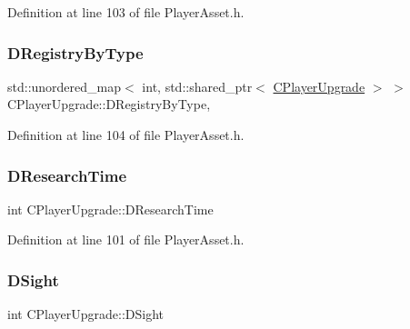 Definition at line 103 of file Player\+Asset.\+h.

\hypertarget{classCPlayerUpgrade_a04673f65215501e9eb0ce7828091c30c}{}\label{classCPlayerUpgrade_a04673f65215501e9eb0ce7828091c30c} 
\subsubsection{\texorpdfstring{D\+Registry\+By\+Type}{DRegistryByType}}
{\footnotesize\ttfamily std\+::unordered\+\_\+map$<$ int, std\+::shared\+\_\+ptr$<$ \hyperlink{classCPlayerUpgrade}{C\+Player\+Upgrade} $>$ $>$ C\+Player\+Upgrade\+::\+D\+Registry\+By\+Type\hspace{0.3cm}{\ttfamily [static]}, {\ttfamily [protected]}}



Definition at line 104 of file Player\+Asset.\+h.

\hypertarget{classCPlayerUpgrade_ae233bf472f72c8f16a6f1b1ea3b78012}{}\label{classCPlayerUpgrade_ae233bf472f72c8f16a6f1b1ea3b78012} 
\subsubsection{\texorpdfstring{D\+Research\+Time}{DResearchTime}}
{\footnotesize\ttfamily int C\+Player\+Upgrade\+::\+D\+Research\+Time\hspace{0.3cm}{\ttfamily [protected]}}



Definition at line 101 of file Player\+Asset.\+h.

\hypertarget{classCPlayerUpgrade_ad07eacdeddddd94cf9766dc04d380b55}{}\label{classCPlayerUpgrade_ad07eacdeddddd94cf9766dc04d380b55} 
\subsubsection{\texorpdfstring{D\+Sight}{DSight}}
{\footnotesize\ttfamily int C\+Player\+Upgrade\+::\+D\+Sight\hspace{0.3cm}{\ttfamily [protected]}}



